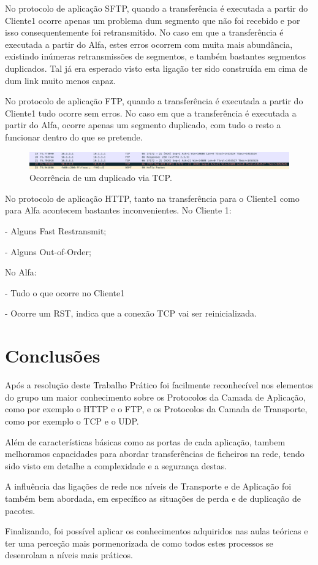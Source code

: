 \documentclass{llncs}
\begin{document}
No protocolo de aplicação SFTP, quando a transferência é executada a partir do Cliente1 ocorre apenas um problema dum segmento que não foi recebido e por isso consequentemente foi retransmitido. No caso em que a transferência é executada a partir do Alfa, estes erros ocorrem com muita mais abundância, existindo inúmeras retransmissões de segmentos, e também bastantes segmentos duplicados. Tal já era esperado visto esta ligação ter sido construída em cima de dum link muito menos capaz.

No protocolo de aplicação FTP, quando a transferência é executada a partir do Cliente1 tudo ocorre sem erros. No caso em que a transferência é executada a partir do Alfa, ocorre apenas um segmento duplicado, com tudo o resto a funcionar dentro do que se pretende.
\begin{figure}[H]
\begin{center}
\includegraphics[scale=0.40]{4_ftp.png}
\end{center}
\caption{\label{fig:ssh}Ocorrência de um duplicado via TCP.}
\end{figure}

No protocolo de aplicação HTTP, tanto na transferência para o Cliente1 como para Alfa acontecem bastantes inconvenientes. No Cliente 1:

	- Alguns Fast Restransmit;

	- Alguns Out-of-Order;

No Alfa:

	- Tudo o que ocorre no Cliente1

	- Ocorre um RST, indica que a conexão TCP vai ser reinicializada.



\section{Conclusões}

Após a resolução deste Trabalho Prático foi facilmente reconhecível nos elementos do grupo um maior conhecimento sobre os  Protocolos da Camada de Aplicação, como por exemplo o HTTP e o FTP, e os Protocolos da Camada de Transporte, como por exemplo o TCP e o UDP.

Além de características básicas como as portas de cada aplicação, tambem melhoramos capacidades para abordar transferências de ficheiros na rede, tendo sido visto em detalhe a complexidade e a segurança destas.

A influência das ligações de rede nos níveis de Transporte e de Aplicação foi também bem abordada, em específico as situações de perda e de duplicação de pacotes.

Finalizando, foi possível aplicar os conhecimentos adquiridos nas aulas teóricas e ter uma perceção mais pormenorizada de como todos estes processos se desenrolam a níveis mais práticos.
\end{document}
